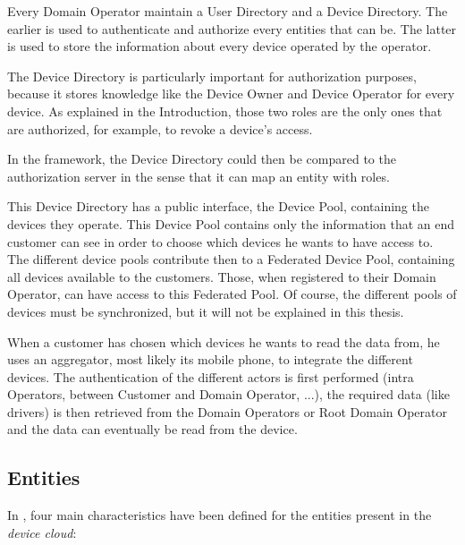 Every Domain Operator maintain a User Directory and a Device Directory. The earlier is used to authenticate and authorize every entities that can be. The latter is used to store the information about every device operated by the operator.

The Device Directory is particularly important for authorization purposes, because it stores knowledge like the Device Owner and Device Operator for every device. As explained in the Introduction, those two roles are the only ones that are authorized, for example, to revoke a device's access. 

In the framework, the Device Directory could then be compared to the authorization server in the sense that it can map an entity with roles.

This Device Directory has a public interface, the Device Pool, containing the devices they operate. This Device Pool contains only the information that an end customer can see in order to choose which devices he wants to have access to. The different device pools contribute then to a Federated Device Pool, containing all devices available to the customers. Those, when registered to their Domain Operator, can have access to this Federated Pool. Of course, the different pools of devices must be synchronized, but it will not be explained in this thesis.

When a customer has chosen which devices he wants to read the data from, he uses an aggregator, most likely its mobile phone, to integrate the different devices. The authentication of the different actors is first performed (intra Operators, between Customer and Domain Operator, ...), the required data (like drivers) is then retrieved from the Domain Operators or Root Domain Operator and the data can eventually be read from the device.

 \subsection{Entities}
 In , four main characteristics have been defined for the entities present in the \emph{device cloud}:
 
